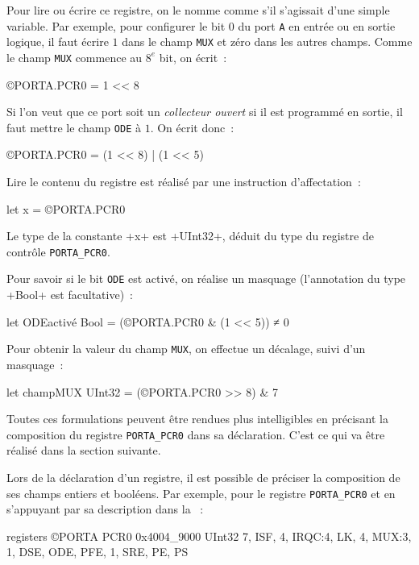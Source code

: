 Pour lire ou écrire ce registre, on le nomme comme s'il s'agissait d'une simple variable. Par exemple, pour configurer le bit $0$ du port \texttt{A} en entrée ou en sortie logique, il faut écrire $1$ dans le champ \texttt{MUX} et zéro dans les autres champs. Comme le champ \texttt{MUX} commence au $8^e$ bit, on écrit~:

\begin{PLM}
©PORTA.PCR0 = 1 << 8
\end{PLM}

Si l'on veut que ce port soit un \emph{collecteur ouvert} si il est programmé en sortie, il faut mettre le champ \texttt{ODE} à $1$. On écrit donc~:
\begin{PLM}
©PORTA.PCR0 = (1 << 8) | (1 << 5)
\end{PLM}

Lire le contenu du registre est réalisé par une instruction d'affectation~:
\begin{PLM}
let x = ©PORTA.PCR0
\end{PLM}
Le type de la constante \plm+x+ est \plm+UInt32+, déduit du type du registre de contrôle \texttt{PORTA\_PCR0}.

Pour savoir si le bit \texttt{ODE} est activé, on réalise un masquage (l'annotation du type \plm+Bool+ est facultative)~:
\begin{PLM}
let ODEactivé Bool = (©PORTA.PCR0 & (1 << 5)) ≠ 0
\end{PLM}

Pour obtenir la valeur du champ \texttt{MUX}, on effectue un décalage, suivi d'un masquage~:
\begin{PLM}
let champMUX UInt32 = (©PORTA.PCR0 >> 8) & 7
\end{PLM}
 
 
Toutes ces formulations peuvent être rendues plus intelligibles en précisant la composition du registre \texttt{PORTA\_PCR0} dans sa déclaration. C'est ce qui va être réalisé dans la section suivante.









Lors de la déclaration d'un registre, il est possible de préciser la composition de ses champs entiers et booléens. Par exemple, pour le registre \texttt{PORTA\_PCR0} et en s'appuyant par sa description dans la ~:

\begin{PLM}
registers ©PORTA {
  PCR0 0x4004_9000 UInt32 {
    7, ISF, 4, IRQC:4, LK, 4, MUX:3, 1, DSE, ODE, PFE, 1, SRE, PE, PS
  }
}
\end{PLM}

